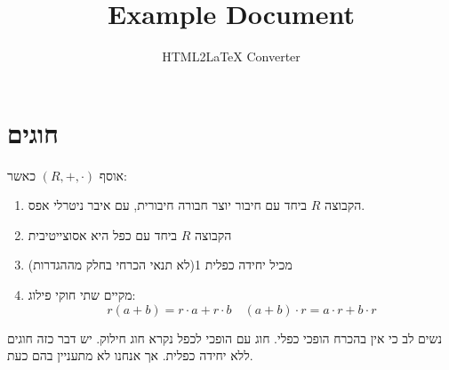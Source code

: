 \documentclass{tstextbook}
\begin{document}
\title{Example Document}
\author{HTML2LaTeX Converter}
\maketitle


\section{חוגים}

\begin{definition}[חוג]
אוסף \(\left( R,+,\cdot \right)\)  כאשר:

  \begin{enumerate}
    \item הקבוצה \(R\) ביחד עם חיבור יוצר חבורה חיבורית, עם איבר ניטרלי אפס. 


    \item הקבוצה \(R\) ביחד עם כפל היא אסוצייטיבית  


    \item מכיל יחידה כפלית 1(לא תנאי הכרחי בחלק מההגדרות) 


    \item מקיים שתי חוקי פילוג: 
$$r(a+b)=r\cdot a+r\cdot b\quad (a+b)\cdot r=a\cdot r+b\cdot r$$


  \end{enumerate}
\end{definition}
נשים לב כי אין בהכרח הופכי כפלי. חוג עם הופכי לכפל נקרא חוג חילוק. יש דבר כזה חוגים ללא יחידה כפלית. אך אנחנו לא מתעניין בהם כעת.
\end{document}
